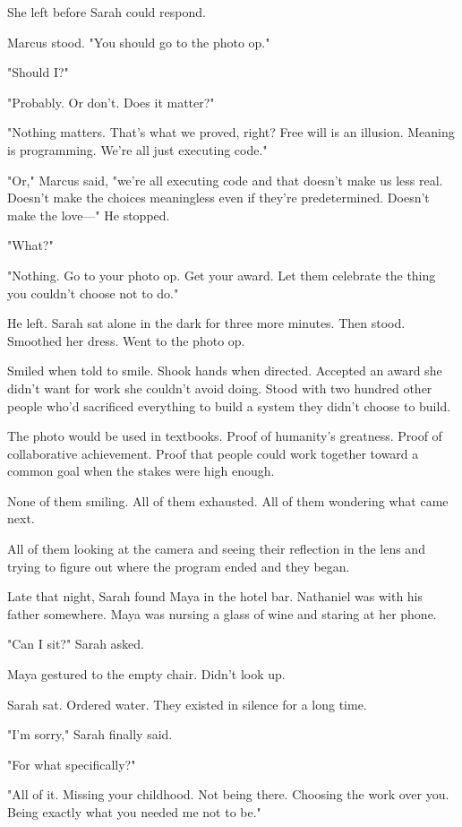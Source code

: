 She left before Sarah could respond.

Marcus stood. "You should go to the photo op."

"Should I?"

"Probably. Or don't. Does it matter?"

"Nothing matters. That's what we proved, right? Free will is an illusion. Meaning is programming. We're all just executing code."

"Or," Marcus said, "we're all executing code and that doesn't make us less real. Doesn't make the choices meaningless even if they're predetermined. Doesn't make the love—" He stopped.

"What?"

"Nothing. Go to your photo op. Get your award. Let them celebrate the thing you couldn't choose not to do."

He left. Sarah sat alone in the dark for three more minutes. Then stood. Smoothed her dress. Went to the photo op.

Smiled when told to smile. Shook hands when directed. Accepted an award she didn't want for work she couldn't avoid doing. Stood with two hundred other people who'd sacrificed everything to build a system they didn't choose to build.

The photo would be used in textbooks. Proof of humanity's greatness. Proof of collaborative achievement. Proof that people could work together toward a common goal when the stakes were high enough.

None of them smiling. All of them exhausted. All of them wondering what came next.

All of them looking at the camera and seeing their reflection in the lens and trying to figure out where the program ended and they began.

\scenebreak

Late that night, Sarah found Maya in the hotel bar. Nathaniel was with his father somewhere. Maya was nursing a glass of wine and staring at her phone.

"Can I sit?" Sarah asked.

Maya gestured to the empty chair. Didn't look up.

Sarah sat. Ordered water. They existed in silence for a long time.

"I'm sorry," Sarah finally said.

"For what specifically?"

"All of it. Missing your childhood. Not being there. Choosing the work over you. Being exactly what you needed me not to be."

